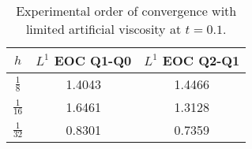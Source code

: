 \begin{table}
	\centering
	\begin{tabular}{|c|c|c|}
		\hline
		$h$ & $L^1$ EOC Q1-Q0 & $L^1$ EOC Q2-Q1 \\
		\hline\hline
		$\frac{1}{8}$ & 1.4043 & 1.4466\\
		\hline
		$\frac{1}{16}$ & 1.6461 & 1.3128\\
		\hline
		$\frac{1}{32}$ & 0.8301 & 0.7359\\
		\hline
	\end{tabular}
	\caption{Experimental order of convergence with limited artificial viscosity at $t=0.1$.}
	\label{{tab:eoc_Q{q}_Q{k}}}
\end{table}
